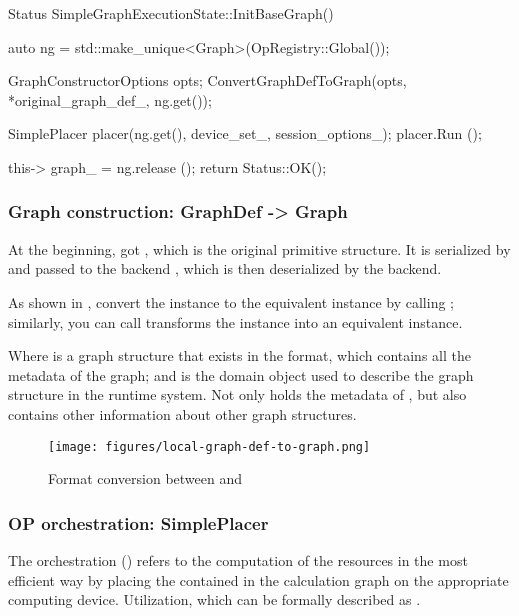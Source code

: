 \begin{leftbar}
\begin{c++}
Status SimpleGraphExecutionState::InitBaseGraph() {
  auto ng = std::make_unique<Graph>(OpRegistry::Global());

  GraphConstructorOptions opts;
  ConvertGraphDefToGraph(opts, *original_graph_def_, ng.get());

  SimplePlacer placer(ng.get(), device_set_, session_options_);
  placer.Run ();

  this-> graph_ = ng.release ();
  return Status::OK();
}
\end{c++}
\end{leftbar}


\subsubsection{Graph construction: GraphDef -> Graph}
At the beginning,  got , which is the original primitive structure. It is serialized by  and passed to the backend , which is then deserialized by the backend.

As shown in , convert the  instance to the equivalent  instance by calling ; similarly, you can call  transforms the  instance into an equivalent  instance.

Where  is a graph structure that exists in the  format, which contains all the metadata of the graph; and  is the domain object used to describe the graph structure in the runtime system. Not only holds the metadata of , but also contains other information about other graph structures.

\begin{figure}[H]
  \centering
  \texttt{[image: figures/local-graph-def-to-graph.png]}
  \caption{Format conversion between  and }
  \label{fig:local-graph-def-to-graph}
\end{figure}


\subsubsection{OP orchestration: SimplePlacer}
The  orchestration () refers to the computation of the resources in the most efficient way by placing the  contained in the calculation graph on the appropriate computing device. Utilization, which can be formally described as .

